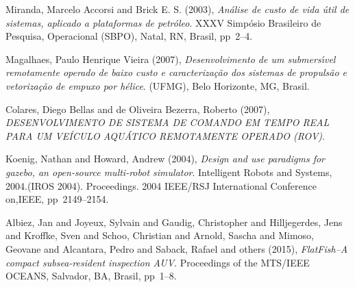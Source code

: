\begin{thebibliography}{999}

Miranda, Marcelo Accorsi and Brick E. S. (2003),  
{\it An{\'a}lise de custo de vida {\'u}til de sistemas, aplicado a plataformas de petr{\'o}leo}.  
XXXV Simp{\'o}sio Brasileiro de Pesquisa, Operacional (SBPO), Natal, RN, Brasil, pp~2--4.

Magalhaes, Paulo Henrique Vieira (2007),  
{\it Desenvolvimento de um submers{\'\i}vel remotamente operado de baixo custo e caracteriza{\c{c}}{\~a}o dos sistemas de propuls{\~a}o e vetoriza{\c{c}}{\~a}o de empuxo por h{\'e}lice}.  
(UFMG), Belo Horizonte, MG, Brasil.

Colares, Diego Bellas and de Oliveira Bezerra, Roberto (2007),  
{\it DESENVOLVIMENTO DE SISTEMA DE COMANDO EM TEMPO REAL PARA UM VE{\'I}CULO AQU{\'A}TICO REMOTAMENTE OPERADO (ROV)}.  

Koenig, Nathan and Howard, Andrew (2004),  
{\it Design and use paradigms for gazebo, an open-source multi-robot simulator}.  
Intelligent Robots and Systems, 2004.(IROS 2004). Proceedings. 2004 IEEE/RSJ International Conference on,IEEE, pp~2149--2154.

Albiez, Jan and Joyeux, Sylvain and Gaudig, Christopher and Hilljegerdes, Jens and Kroffke, Sven and Schoo, Christian and Arnold, Sascha and Mimoso, Geovane and Alcantara, Pedro and Saback, Rafael and others (2015),  
{\it FlatFish--A compact subsea-resident inspection AUV}.  
Proceedings of the MTS/IEEE OCEANS, Salvador, BA, Brasil, pp~1--8.








\end{thebibliography}




